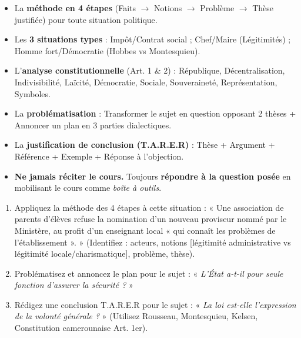 \documentclass[11pt]{article}
\begin{document}
\begin{aretenir}
\begin{itemize}
    \item La \textbf{méthode en 4 étapes} (Faits $\rightarrow$ Notions $\rightarrow$ Problème $\rightarrow$ Thèse justifiée) pour toute situation politique.
    \item Les \textbf{3 situations types} : Impôt/Contrat social ; Chef/Maire (Légitimités) ; Homme fort/Démocratie (Hobbes vs Montesquieu).
    \item L'\textbf{analyse constitutionnelle} (Art. 1 \& 2) : République, Décentralisation, Indivisibilité, Laïcité, Démocratie, Sociale, Souveraineté, Représentation, Symboles.
    \item La \textbf{problématisation} : Transformer le sujet en question opposant 2 thèses + Annoncer un plan en 3 parties dialectiques.
    \item La \textbf{justification de conclusion (T.A.R.E.R)} : Thèse + Argument + Référence + Exemple + Réponse à l'objection.
    \item \textbf{Ne jamais réciter le cours.} Toujours \textbf{répondre à la question posée} en mobilisant le cours comme \emph{boîte à outils}.
\end{itemize}
\end{aretenir}

\begin{exercice}
\begin{enumerate}
    \item Appliquez la méthode des 4 étapes à cette situation : « Une association de parents d'élèves refuse la nomination d'un nouveau proviseur nommé par le Ministère, au profit d'un enseignant local « qui connaît les problèmes de l'établissement ». » (Identifiez : acteurs, notions [légitimité administrative vs légitimité locale/charismatique], problème, thèse).
    \item Problématisez et annoncez le plan pour le sujet : « \emph{L'État a-t-il pour seule fonction d'assurer la sécurité ?} »
    \item Rédigez une conclusion T.A.R.E.R pour le sujet : « \emph{La loi est-elle l'expression de la volonté générale ?} » (Utilisez Rousseau, Montesquieu, Kelsen, Constitution camerounaise Art. 1er).
\end{enumerate}
\end{exercice}
\end{document}
